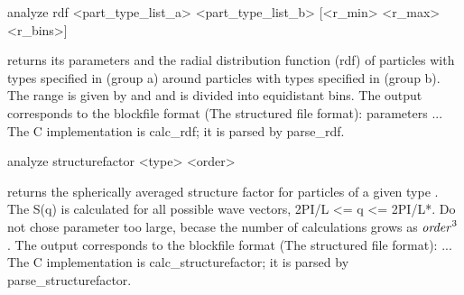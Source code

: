 \begin{tclcode}
 analyze rdf { <part_type_list_a> } { <part_type_list_b> }
[<r_min> <r_max> <r_bins>] 
\end{tclcode}
returns its parameters and the radial distribution function (rdf) of particles with types specified in  (group a) around particles with types specified in  (group b). The range is given by  and  and is divided into  equidistant bins. The output corresponds to the blockfile format (The structured file format):
{ parameters } { {   } ... }
The C implementation is calc\_rdf; it is parsed by parse\_rdf.

\begin{tclcode}
 analyze structurefactor { <type> <order> } 
\end{tclcode}
returns the spherically averaged structure factor for particles of a given type . The S(q) is calculated for all possible wave vectors, 2PI/L <= q <= 2PI/L*. Do not chose parameter  too large, becase the number of calculations grows as $\mbox{\textrm{\textit{order}}}^3$. The output corresponds to the blockfile format (The structured file format):
{   } ...
The C implementation is calc\_structurefactor; it is parsed by parse\_structurefactor.

